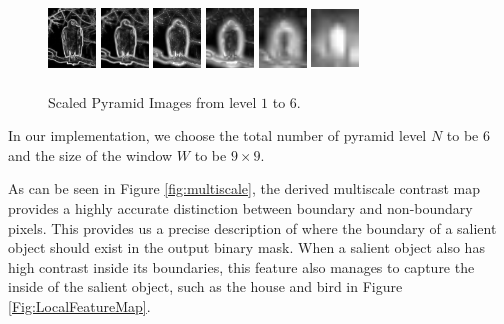 \documentclass[10pt,twocolumn,letterpaper]{article}
\begin{document}
\begin{figure}[b]
\begin{center} 
  \includegraphics[width=0.5in,height=0.75in]{./Figures/pyramid/5_145_145839_p0.jpg} 
 \includegraphics[width=0.5in,height=0.75in]{./Figures/pyramid/5_145_145839_p1.jpg} 
\includegraphics[width=0.5in,height=0.75in]{./Figures/pyramid/5_145_145839_p2.jpg} 
\includegraphics[width=0.5in,height=0.75in]{./Figures/pyramid/5_145_145839_p3.jpg} 
 \includegraphics[width=0.5in,height=0.75in]{./Figures/pyramid/5_145_145839_p4.jpg} 
 \includegraphics[width=0.5in,height=0.75in]{./Figures/pyramid/5_145_145839_p5.jpg}
 \caption{Scaled Pyramid Images from level $1$ to $6$.}
\end{center}
\end{figure}


In our implementation, we choose the total number of pyramid level $N$ to be $6$ and the size of the window $W$ to be $9 \times 9$. 

As can be seen in Figure \ref{fig:multiscale}, the derived multiscale contrast map provides a highly accurate distinction between boundary and non-boundary pixels. This provides us a precise description of where the boundary of a salient object should exist in the output binary mask. When a salient object also has high contrast inside its boundaries, this feature also manages to capture the inside of the salient object, such as the house and bird in Figure \ref{Fig:LocalFeatureMap}.
\end{document}
